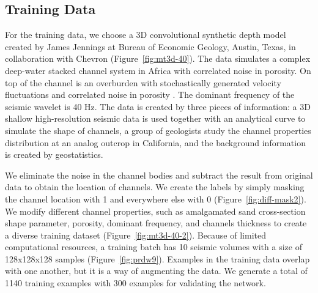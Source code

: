 \subsection{Training Data} 
For the training data, we choose a 3D convolutional synthetic depth model created by James Jennings at Bureau of Economic Geology, Austin, Texas, in collaboration with Chevron (Figure~\ref{fig:mt3d-40}). The data simulates a complex deep-water stacked channel system in Africa with correlated noise in porosity. On top of the channel is an overburden with stochastically generated velocity fluctuations and correlated noise in porosity \cite[]{diffraction}. The dominant frequency of the seismic wavelet is 40 Hz. The data is created by three pieces of information: a 3D shallow high-resolution seismic data is used together with an analytical curve to simulate the shape of channels, a group of geologists study the channel properties distribution at an analog outcrop in California, and the background information is created by geostatistics.

We eliminate the noise in the channel bodies and subtract the result from original data to obtain the location of channels. We create the labels by simply masking the channel location with 1 and everywhere else with 0 (Figure~\ref{fig:diff-mask2}). We modify different channel properties, such as amalgamated sand cross-section shape parameter, porosity, dominant frequency, and channels thickness to create a diverse training dataset (Figure~\ref{fig:mt3d-40-2}). Because of limited computational resources, a training batch has 10 seismic volumes with a size of 128x128x128 samples (Figure~\ref{fig:prdw9}). Examples in the training data overlap with one another, but it is a way of augmenting the data. We generate a total of 1140 training examples with 300 examples for validating the network.

